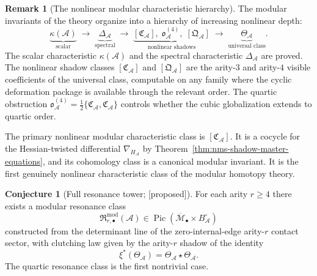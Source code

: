 \documentclass[11pt,oneside]{memoir}
\numberwithin{equation}{chapter}
\theoremstyle{definition}
\newtheorem{conjecture}[theorem]{Conjecture}
\newtheorem{remark}[theorem]{Remark}
\newcommand{\ClaimStatusConjectured}{\textnormal{[proposed]}}
\newcommand{\cA}{\mathcal A}
\begin{document}
\begin{remark}[The nonlinear modular characteristic hierarchy]
\label{rem:nms-characteristic-hierarchy}
The modular invariants of the theory organize into a hierarchy of increasing nonlinear depth:
\[
\underbrace{\kappa(\cA)}_{\text{scalar}}
\;\longrightarrow\;
\underbrace{\Delta_{\cA}}_{\text{spectral}}
\;\longrightarrow\;
\underbrace{[\mathfrak C_{\cA}],\; \mathfrak o_{\cA}^{(4)},\; [\mathfrak Q_{\cA}]}_{\text{nonlinear shadows}}
\;\longrightarrow\;
\underbrace{\Theta_{\cA}}_{\text{universal class}}.
\]
The scalar characteristic $\kappa(\cA)$ and the spectral characteristic $\Delta_{\cA}$ are proved.  The nonlinear shadow classes $[\mathfrak C_{\cA}]$ and $[\mathfrak Q_{\cA}]$ are the arity-$3$ and arity-$4$ visible coefficients of the universal class, computable on any family where the cyclic deformation package is available through the relevant order.  The quartic obstruction $\mathfrak o_{\cA}^{(4)} = \frac12\{\mathfrak C_{\cA},\mathfrak C_{\cA}\}$ controls whether the cubic globalization extends to quartic order.

The primary nonlinear modular characteristic class is $[\mathfrak C_{\cA}]$.  It is a cocycle for the Hessian-twisted differential $\nabla_{H_{\cA}}$ by Theorem~\ref{thm:nms-shadow-master-equations}, and its cohomology class is a canonical modular invariant.  It is the first genuinely nonlinear characteristic class of the modular homotopy theory.
\end{remark}

\begin{conjecture}[Full resonance tower; \ClaimStatusConjectured]
\label{conj:nms-full-resonance-tower}
For each arity $r\ge 4$ there exists a modular resonance class
\[
\mathfrak R_{r,\bullet}^{\mathrm{mod}}(\cA)
\in \operatorname{Pic}(\overline{\mathcal M}_{\bullet}\times B_{\cA}^{\circ})
\]
constructed from the determinant line of the zero-internal-edge arity-$r$ contact sector, with clutching law given by the arity-$r$ shadow of the identity
\[
\xi^*(\Theta_{\cA})=\Theta_{\cA}\star \Theta_{\cA}.
\]
The quartic resonance class is the first nontrivial case.
\end{conjecture}
\end{document}
